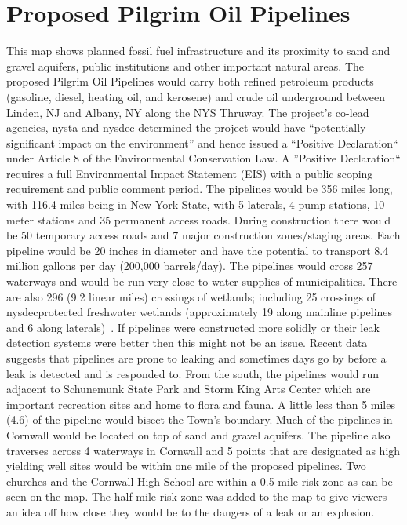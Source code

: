\section{Proposed Pilgrim Oil Pipelines}\label{subec:pilgrim}
This map shows planned fossil fuel infrastructure and its proximity to sand and 
gravel aquifers, public institutions and other important natural areas. The 
proposed Pilgrim Oil Pipelines would carry both refined petroleum products 
(gasoline, diesel, heating oil, and kerosene) and crude oil underground between 
Linden, NJ and Albany, NY along the NYS Thruway. The project’s co-lead 
agencies, \gls{nysta} and \gls{nysdec} determined the project would have 
``potentially significant impact on the environment'' and hence issued a 
``Positive Declaration`` under Article 8 of the Environmental Conservation Law. 
A ''Positive Declaration`` requires a full Environmental Impact Statement (EIS) 
with a public scoping requirement and public comment period. The pipelines 
would be 356 miles long, with 116.4 miles being in New York State, with 5 
laterals, 4 pump stations, 10 meter stations and 35 permanent access roads. 
During construction there would be 50 temporary access roads and 7 major 
construction zones/staging areas. Each pipeline would be 20 inches in diameter 
and have the potential to transport 8.4 million gallons per day (200,000 
barrels/day). The pipelines would cross 257 waterways and would be run very 
close to water supplies of municipalities. There are also 296 (9.2 linear 
miles) crossings of wetlands; including 25 crossings of \gls{nysdec}protected 
freshwater wetlands (approximately 19 along mainline pipelines and 6 along 
laterals)~\citep{nysdecpilgrim}. If pipelines were constructed more solidly or 
their leak detection systems were better then this might not be an issue. 
Recent data suggests that pipelines are prone to leaking and sometimes days go 
by before a leak is detected and is responded to.
From the south, the pipelines would run adjacent to Schunemunk State Park and 
Storm King Arts Center which are important recreation sites and home to flora 
and fauna. A little less than 5 miles (4.6) of the pipeline would bisect the 
Town’s boundary. Much of the pipelines in Cornwall would be located on top of 
sand and gravel aquifers. The pipeline also traverses across 4 waterways in 
Cornwall and 5 points that are designated as high yielding well sites would be 
within one mile of the proposed pipelines. Two churches and the Cornwall High 
School are within a 0.5 mile risk zone as can be seen on the map. The half mile 
risk zone was added to the map to give viewers an idea off how close they would 
be to the dangers of a leak or an explosion.


